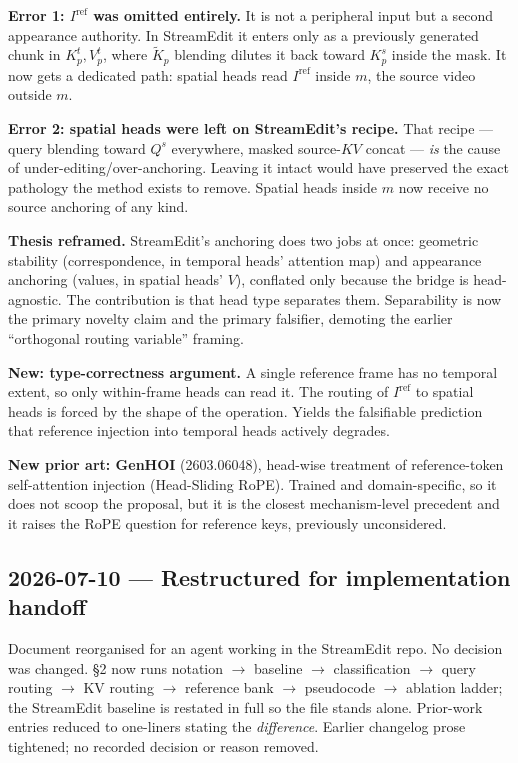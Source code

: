 \documentclass{article}
\begin{document}
\textbf{Error 1: $I^{\mathrm{ref}}$ was omitted entirely.} It is not a peripheral
input but a second appearance authority. In StreamEdit it enters only as a
previously generated chunk in $K^{t}_p,V^{t}_p$, where $\tilde{K}_p$ blending
dilutes it back toward $K^{s}_p$ inside the mask. It now gets a dedicated path:
spatial heads read $I^{\mathrm{ref}}$ inside $m$, the source video outside $m$.

\textbf{Error 2: spatial heads were left on StreamEdit's recipe.} That recipe ---
query blending toward $Q^{s}$ everywhere, masked source-$KV$ concat --- \emph{is}
the cause of under-editing/over-anchoring. Leaving it intact would have preserved
the exact pathology the method exists to remove. Spatial heads inside $m$ now
receive no source anchoring of any kind.

\textbf{Thesis reframed.} StreamEdit's anchoring does two jobs at once:
geometric stability (correspondence, in temporal heads' attention map) and
appearance anchoring (values, in spatial heads' $V$), conflated only because the
bridge is head-agnostic. The contribution is that head type separates them.
Separability is now the primary novelty claim and the primary falsifier,
demoting the earlier ``orthogonal routing variable'' framing.

\textbf{New: type-correctness argument.} A single reference frame has no temporal
extent, so only within-frame heads can read it. The routing of $I^{\mathrm{ref}}$
to spatial heads is forced by the shape of the operation. Yields the falsifiable
prediction that reference injection into temporal heads actively degrades.

\textbf{New prior art: GenHOI} (2603.06048), head-wise treatment of
reference-token self-attention injection (Head-Sliding RoPE). Trained and
domain-specific, so it does not scoop the proposal, but it is the closest
mechanism-level precedent and it raises the RoPE question for reference keys,
previously unconsidered.

\subsection*{2026-07-10 --- Restructured for implementation handoff}

Document reorganised for an agent working in the StreamEdit repo. No decision
was changed. \S2 now runs notation $\to$ baseline $\to$ classification $\to$
query routing $\to$ KV routing $\to$ reference bank $\to$ pseudocode $\to$
ablation ladder; the StreamEdit baseline is restated in full so the file stands
alone. Prior-work entries reduced to one-liners stating the \emph{difference}.
Earlier changelog prose tightened; no recorded decision or reason removed.
\end{document}
